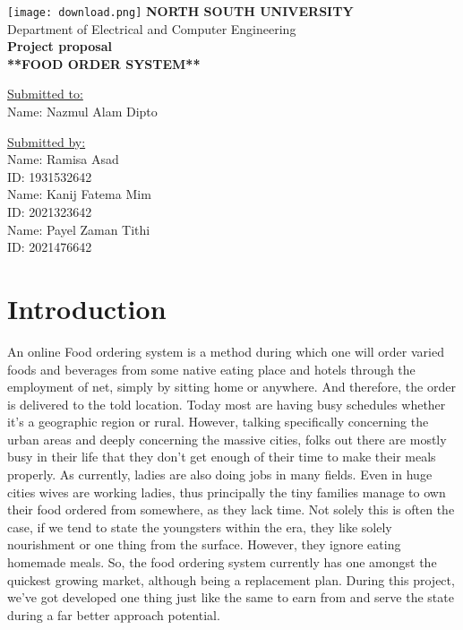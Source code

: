 \documentclass[letterpaper]{report}
\begin{document}
\begin{center}
\centering
\texttt{[image: download.png]}
\flushleft
\LARGE
\centering
\textbf{NORTH SOUTH UNIVERSITY}\\[0.2cm]
Department of Electrical and Computer Engineering\\[0.7cm]
\textbf{Project proposal}\\[1.5cm]
\textbf{**FOOD ORDER SYSTEM**}\\[1.5cm]
\end{center}
\begin{minipage}[t]{0.47\textwidth}
\flushright
\LARGE
\underline{Submitted to:}\\[0.2cm]
\large
Name: Nazmul Alam Dipto \\
\end{minipage}
\hfill\begin{minipage}[t]{0.47\textwidth}
\raggedleft 
\LARGE
\underline{Submitted by:}\\[0.2cm]
\large{Name: Ramisa Asad}\\
ID: 1931532642\\
Name: Kanij Fatema Mim\\
ID: 2021323642 \\
Name: Payel Zaman Tithi\\
ID: 2021476642\\
\end{minipage}
\newpage
\section{Introduction}
\large
An online Food ordering system is a method during which one will order varied foods and beverages from some native eating place and hotels through the employment of net, simply by sitting home or anywhere. And therefore, the order is delivered to the told location. Today most are having busy schedules whether it's a geographic region or rural. However, talking specifically concerning the urban areas and deeply concerning the massive cities, folks out there are mostly busy in their life that they don’t get enough of their time to make their meals properly. As currently, ladies are also doing jobs in many fields. Even in huge cities wives are working ladies, thus principally the tiny families manage to own their food ordered from somewhere, as they lack time. Not solely this is often the case, if we tend to state the youngsters within the era, they like solely nourishment or one thing from the surface. However, they ignore eating homemade meals. 
So, the food ordering system currently has one amongst the quickest growing market, although being a replacement plan. During this project, we've got developed one thing just like the same to earn from and serve the state during a far better approach potential.
\end{document}
